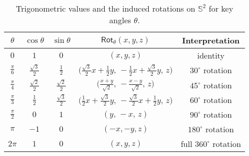 \documentclass[11pt,openany]{article}
\begin{document}
\begin{table}[h]
	\centering
	\begin{tabular}{@{}ccccc@{}}
		\toprule
		$\theta$ & $\cos\theta$ & $\sin\theta$
		& $\mathsf{Rot}_\theta(x,y,z)$
		& Interpretation \\
		\midrule
		$0$ 
		& $1$ 
		& $0$ 
		& $(x,y,z)$ 
		& identity \\[6pt]
		
		$\displaystyle \frac{\pi}{6}$ 
		& $\tfrac{\sqrt3}{2}$ 
		& $\tfrac12$ 
		& $\bigl(\tfrac{\sqrt3}{2}x + \tfrac12y,\,-\tfrac12x + \tfrac{\sqrt3}{2}y,\,z\bigr)$ 
		& $30^\circ$ rotation \\[6pt]
		
		$\displaystyle \frac{\pi}{4}$ 
		& $\tfrac{\sqrt2}{2}$ 
		& $\tfrac{\sqrt2}{2}$ 
		& $\bigl(\tfrac{x+y}{\sqrt2},\,-\tfrac{x-y}{\sqrt2},\,z\bigr)$ 
		& $45^\circ$ rotation \\[6pt]
		
		$\displaystyle \frac{\pi}{3}$ 
		& $\tfrac12$ 
		& $\tfrac{\sqrt3}{2}$ 
		& $\bigl(\tfrac12 x + \tfrac{\sqrt3}{2}y,\,-\tfrac{\sqrt3}{2}x + \tfrac12 y,\,z\bigr)$ 
		& $60^\circ$ rotation \\[6pt]
		
		$\displaystyle \frac{\pi}{2}$ 
		& $0$ 
		& $1$ 
		& $(y,\,-x,\,z)$ 
		& $90^\circ$ rotation \\[6pt]
		
		$\pi$ 
		& $-1$ 
		& $0$ 
		& $(-x,-y,z)$ 
		& $180^\circ$ rotation \\[6pt]
		
		$2\pi$ 
		& $1$ 
		& $0$ 
		& $(x,y,z)$ 
		& full $360^\circ$ rotation \\
		
		\bottomrule
	\end{tabular}
	\caption{Trigonometric values and the induced rotations on \(\mathbb{S}^2\) for key angles \(\theta\).}
\end{table}
\end{document}
